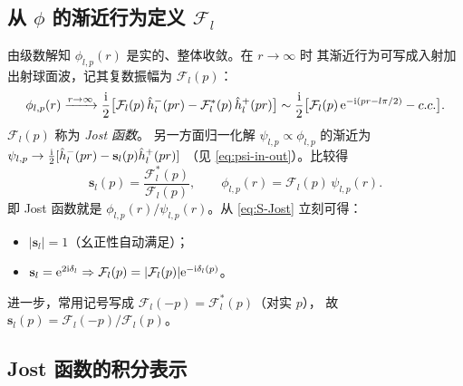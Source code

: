 \subsection{从 $\phi$ 的渐近行为定义 $\mathcal F_l$}

由级数解知 $\phi_{l,p}(r)$ 是实的、整体收敛。在 $r\to\infty$ 时
其渐近行为可写成入射加出射球面波，记其复数振幅为 $\mathcal F_l(p)$：
\begin{equation}\label{eq:phi-asy}
\phi_{l,p}(r)\xrightarrow{r\to\infty}
\frac{\mathrm{i}}{2}\bigl[\mathcal F_l(p)\,\hat h_l^-(pr)
                  -\mathcal F_l^*(p)\,\hat h_l^+(pr)\bigr]
\sim
\frac{\mathrm{i}}{2}\bigl[\mathcal F_l(p)\,\mathrm{e}^{-\mathrm{i}(pr-l\pi/2)}-c.c.\bigr].
\end{equation}
$\mathcal F_l(p)$ 称为 \emph{Jost 函数}。
另一方面归一化解 $\psi_{l,p}\propto\phi_{l,p}$ 的渐近为
$\psi_{l,p}\to\frac{\mathrm{i}}{2}[\hat h_l^-(pr)-\mathbf s_l(p)\hat h_l^+(pr)]$
（见 \eqref{eq:psi-in-out}）。比较得
\begin{equation}\label{eq:S-Jost}
\boxed{\;\mathbf s_l(p)=\frac{\mathcal F_l^*(p)}{\mathcal F_l(p)},\qquad
\phi_{l,p}(r)=\mathcal F_l(p)\,\psi_{l,p}(r).\;}
\end{equation}
即 Jost 函数就是 $\phi_{l,p}(r)/\psi_{l,p}(r)$。从 \eqref{eq:S-Jost}
立刻可得：
\begin{itemize}
\item $|\mathbf s_l|=1$（幺正性自动满足）；
\item $\mathbf s_l=\mathrm{e}^{2\mathrm{i}\delta_l}\Rightarrow
  \mathcal F_l(p)=|\mathcal F_l(p)|\mathrm{e}^{-\mathrm{i}\delta_l(p)}$。
\end{itemize}
进一步，常用记号写成 $\mathcal F_l(-p)=\mathcal F_l^*(p)$（对实 $p$），
故 $\mathbf s_l(p)=\mathcal F_l(-p)/\mathcal F_l(p)$。

\subsection{Jost 函数的积分表示}

